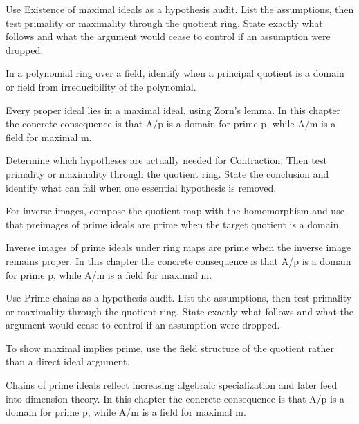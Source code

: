 \begin{exercise}\label{exr:v02-04}
Use Existence of maximal ideals as a hypothesis audit. List the assumptions, then test primality or maximality through the quotient ring. State exactly what follows and what the argument would cease to control if an assumption were dropped.
\end{exercise}
\begin{hint}
In a polynomial ring over a field, identify when a principal quotient is a domain or field from irreducibility of the polynomial.
\end{hint}
\begin{solution}
Every proper ideal lies in a maximal ideal, using Zorn's lemma. In this chapter the concrete consequence is that A/p is a domain for prime p, while A/m is a field for maximal m.
\end{solution}

\begin{exercise}\label{exr:v02-05}
Determine which hypotheses are actually needed for Contraction. Then test primality or maximality through the quotient ring. State the conclusion and identify what can fail when one essential hypothesis is removed.
\end{exercise}
\begin{hint}
For inverse images, compose the quotient map with the homomorphism and use that preimages of prime ideals are prime when the target quotient is a domain.
\end{hint}
\begin{solution}
Inverse images of prime ideals under ring maps are prime when the inverse image remains proper. In this chapter the concrete consequence is that A/p is a domain for prime p, while A/m is a field for maximal m.
\end{solution}

\begin{exercise}\label{exr:v02-06}
Use Prime chains as a hypothesis audit. List the assumptions, then test primality or maximality through the quotient ring. State exactly what follows and what the argument would cease to control if an assumption were dropped.
\end{exercise}
\begin{hint}
To show maximal implies prime, use the field structure of the quotient rather than a direct ideal argument.
\end{hint}
\begin{solution}
Chains of prime ideals reflect increasing algebraic specialization and later feed into dimension theory. In this chapter the concrete consequence is that A/p is a domain for prime p, while A/m is a field for maximal m.
\end{solution}

